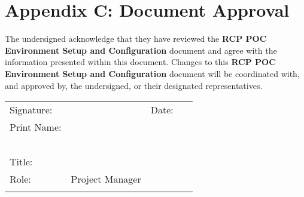 \documentclass[./FDA_document_template.tex]{subfiles}
\begin{document}
\renewcommand{\onlyinsubfile}[1]{#1}
\renewcommand{\notinsubfile}[1]{}
 
 
\pagebreak
\pagestyle{Convertediv}
\part*{Appendix C: Document Approval}
 

The undersigned acknowledge that they have reviewed the \textbf{RCP POC Environment Setup and Configuration} document and agree with the information presented within this document. Changes to this \textbf{RCP POC Environment Setup and Configuration} document will be coordinated with, and approved by, the undersigned, or their designated representatives.


\bigskip

\begin{flushleft}
\tablefirsthead{}
\tablehead{}
\tabletail{}
\tablelasttail{}
\begin{supertabular}{m{2.645cm}m{7.7460003cm}m{1.3859999cm}m{2.9789999cm}}
Signature: &
~
 &
Date: &
~
\\\hhline{~-~-}
Print Name: &
~
 &
~
 &
~
\\\hhline{~-~~}
~
 &
~
 &
~
 &
~
\\\hhline{~-~~}
Title: &
~
 &
~
 &
~
\\\hhline{~-~~}
Role: &
Project Manager &
~
 &
~
\\\hhline{~-~~}
\end{supertabular}
\end{flushleft}
 
\end{document}
